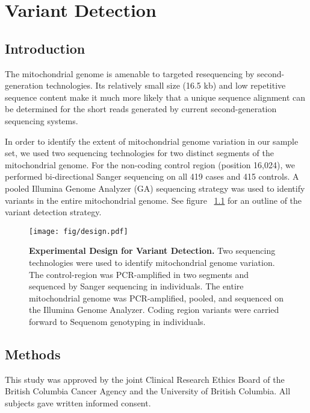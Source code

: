 \chapter{Variant Detection}\label{var}
\section{Introduction}\label{var.introduction}
The mitochondrial genome is amenable to targeted resequencing by second-generation technologies.  Its relatively small size (16.5 \ac{kb}) and low repetitive sequence content make it much more likely that a unique sequence alignment can be determined for the short reads generated by current second-generation sequencing systems.

In order to identify the extent of mitochondrial genome variation in our sample set, we used two sequencing technologies for two distinct segments of the mitochondrial genome.  For the non-coding control region (position 16,024), we performed bi-directional Sanger sequencing on all 419 cases and 415 controls.  A pooled Illumina Genome Analyzer (GA) sequencing strategy was used to identify variants in the entire mitochondrial genome.  See figure ~\ref{var.fig.design} for an outline of the variant detection strategy.

\begin{figure}
  \begin{center}
    \texttt{[image: fig/design.pdf]}
  \end{center}
  \caption[Experimental Design for Variant Detection]{
    \small{\textbf{Experimental Design for Variant Detection.} Two sequencing technologies were used to identify mitochondrial genome variation.  The control-region was PCR-amplified in two segments and sequenced by Sanger sequencing in individuals.  The entire mitochondrial genome was PCR-amplified, pooled, and sequenced on the Illumina Genome Analyzer.  Coding region variants were carried forward to Sequenom genotyping in individuals.}}
  \label{var.fig.design}
\end{figure}

\section{Methods}\label{var.methods}
This study was approved by the joint Clinical Research Ethics Board of the British Columbia Cancer Agency and the University of British Columbia. All subjects gave written informed consent.


